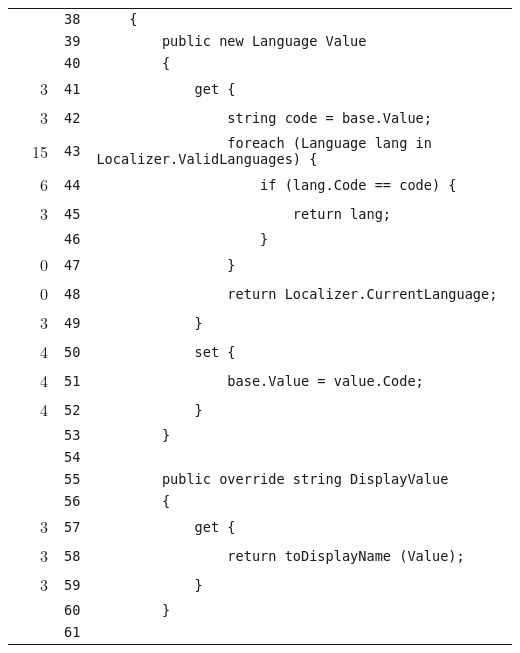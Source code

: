 \documentclass[a4paper,10pt]{article}
\begin{document}
\begin{longtable}[l]{lrrl}
\cellcolor{gray} &  & \verb~38~ & \verb~    {~\\
\cellcolor{gray} &  & \verb~39~ & \verb~        public new Language Value~\\
\cellcolor{gray} &  & \verb~40~ & \verb~        {~\\
\cellcolor{green} & 3 & \verb~41~ & \verb~            get {~\\
\cellcolor{green} & 3 & \verb~42~ & \verb~                string code = base.Value;~\\
\cellcolor{green} & 15 & \verb~43~ & \verb~                foreach (Language lang in Localizer.ValidLanguages) {~\\
\cellcolor{green} & 6 & \verb~44~ & \verb~                    if (lang.Code == code) {~\\
\cellcolor{green} & 3 & \verb~45~ & \verb~                        return lang;~\\
\cellcolor{gray} &  & \verb~46~ & \verb~                    }~\\
\cellcolor{red} & 0 & \verb~47~ & \verb~                }~\\
\cellcolor{red} & 0 & \verb~48~ & \verb~                return Localizer.CurrentLanguage;~\\
\cellcolor{green} & 3 & \verb~49~ & \verb~            }~\\
\cellcolor{green} & 4 & \verb~50~ & \verb~            set {~\\
\cellcolor{green} & 4 & \verb~51~ & \verb~                base.Value = value.Code;~\\
\cellcolor{green} & 4 & \verb~52~ & \verb~            }~\\
\cellcolor{gray} &  & \verb~53~ & \verb~        }~\\
\cellcolor{gray} &  & \verb~54~ & \verb~~\\
\cellcolor{gray} &  & \verb~55~ & \verb~        public override string DisplayValue~\\
\cellcolor{gray} &  & \verb~56~ & \verb~        {~\\
\cellcolor{green} & 3 & \verb~57~ & \verb~            get {~\\
\cellcolor{green} & 3 & \verb~58~ & \verb~                return toDisplayName (Value);~\\
\cellcolor{green} & 3 & \verb~59~ & \verb~            }~\\
\cellcolor{gray} &  & \verb~60~ & \verb~        }~\\
\cellcolor{gray} &  & \verb~61~ & \verb~~\\

\end{longtable}
\end{document}
